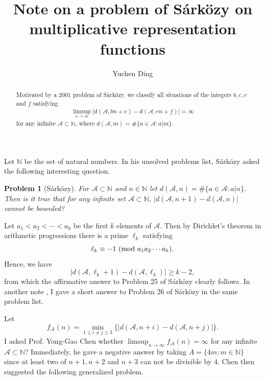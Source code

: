 \documentclass[12pt,a4paper,reqno]{amsart}
\numberwithin{equation}{section}
\def\pmod #1{\ ({\rm{mod}}\ #1)}
\theoremstyle{plain}
\newtheorem{problem}{Problem}
\theoremstyle{definition}
\begin{document}
\title
[{Note on a problem of S\'ark\"ozy on multiplicative representation functions}]
{Note on a problem of S\'ark\"ozy on multiplicative representation functions}

\author
[Y. Ding] {Yuchen Ding}

\address{(Yuchen Ding) School of Mathematics,  Yangzhou University, Yangzhou 225002, People's Republic of China}


\begin{abstract}
Motivated by a 2001 problem of S\'ark\"ozy, we classify all situations of the integers $b,c,e$ and $f$ satisfying 
\begin{align*}
\limsup_{n\rightarrow\infty}|d(\mathcal{A},bn+c)-d(\mathcal{A},en+f)|=\infty
\end{align*}
for any infinite $\mathcal{A}\subset \mathbb{N}$, where 
$
d(\mathcal{A},m)=\#\{a\in \mathcal{A}:a|m\}.
$
\end{abstract}
\maketitle

Let $\mathbb{N}$ be the set of natural numbers. In his unsolved problems list, S\'ark\"ozy  \cite[Problem 25]{Sarkozy} asked the following interesting question.

\begin{problem}[S\'ark\"ozy]\label{pro1}
For $\mathcal{A}\subset \mathbb{N}$ and $n\in \mathbb{N}$ let 
$
d(\mathcal{A},n)=\#\{a\in \mathcal{A}:a|n\}.
$
Then is it true that for any infinite set $\mathcal{A}\subset \mathbb{N}$, $|d(\mathcal{A},n+1)-d(\mathcal{A},n)|$ cannot be bounded?
\end{problem}

Let $a_1<a_2<\cdots<a_k$ be the first $k$ elements of $\mathcal{A}$. Then by Dirichlet's theorem in arithmetic progressions \cite[Theorem 7.9]{Apostol} there is a prime $\ell_k$ satisfying 
$$
\ell_k\equiv -1\pmod{a_1a_2\cdots a_k}.
$$
 Hence, we have
$$
\big|d(\mathcal{A}, \ell_k+1)-d(\mathcal{A}, \ell_k)\big|\ge k-2,
$$
from which the affirmative answer to Problem 25 of S\'ark\"ozy clearly follows. In another note \cite{Ding}, I gave a short answer to Problem 26 of S\'ark\"ozy in the same problem list.

Let
$$
f_{\mathcal{A}}(n)=\min_{1\le i\neq j\le 3}\big\{|d(\mathcal{A},n+i)-d(\mathcal{A},n+j)|\big\}.
$$
I asked Prof. Yong-Gao Chen whether $\limsup_{n\rightarrow\infty}f_{\mathcal{A}}(n)=\infty$ for any infinite $\mathcal{A}\subset \mathbb{N}$? Immediately, he gave a negative answer  by taking $A=\{4m:m\in \mathbb{N}\}$ since at least two of $n+1, n+2$ and $n+3$ can not be divisible by $4$. Chen then suggested the following generalized problem. 
\end{document}
